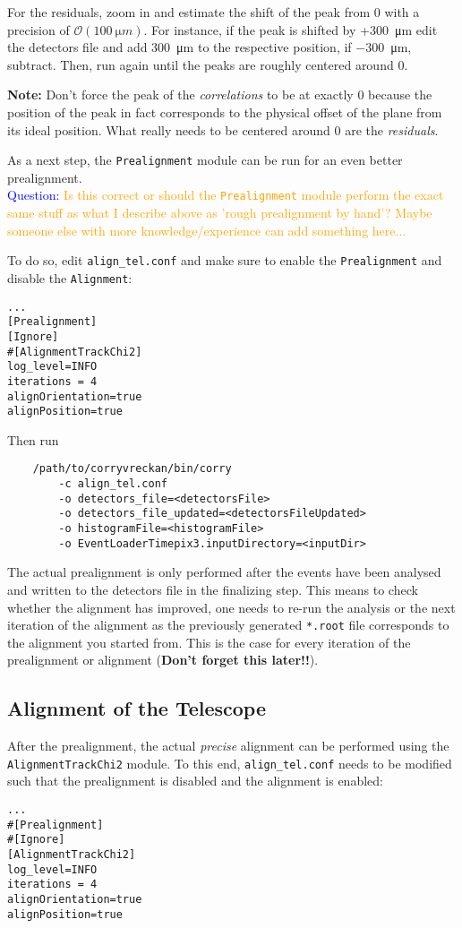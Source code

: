 For the residuals, zoom in and estimate the shift of the peak from 0 with a precision of $\mathcal{O}(\SI{100}{\micro m})$. 
For instance, if the peak is shifted by +\SI{+300}{\micro m} edit the detectors file and add \SI{+300}{\micro m} to the respective position, if \SI{-300}{\micro m}, subtract.
Then, run again until the peaks are roughly centered around 0.

\textbf{Note:} Don't force the peak of the \textit{correlations} to be at exactly 0 because the position of the peak in fact corresponds to the physical offset of the plane from its ideal position. What really needs to be centered around 0 are the \textit{residuals}.

As a next step, the \texttt{Prealignment} module can be run for an even better prealignment.\\
\textcolor{blue}{Question: }\textcolor{orange}{Is this correct or should the \texttt{Prealignment} module perform the exact same stuff as what I describe above as 'rough prealignment by hand'? Maybe someone else with more knowledge/experience can add something here...}

To do so, edit \texttt{align\_tel.conf} and make sure to enable the \texttt{Prealignment} and disable the \texttt{Alignment}:
\begin{verbatim}
...
[Prealignment]
[Ignore]
#[AlignmentTrackChi2]
log_level=INFO
iterations = 4
alignOrientation=true
alignPosition=true
\end{verbatim}

Then run
\begin{verbatim}
    /path/to/corryvreckan/bin/corry 
    	-c align_tel.conf 
    	-o detectors_file=<detectorsFile> 
    	-o detectors_file_updated=<detectorsFileUpdated> 
    	-o histogramFile=<histogramFile> 
    	-o EventLoaderTimepix3.inputDirectory=<inputDir>
\end{verbatim}

The actual prealignment is only performed after the events have been analysed and written to the detectors file in the finalizing step. 
This means to check whether the alignment has improved, one needs to re-run the analysis or the next iteration of the alignment as the previously generated \texttt{*.root} file corresponds to the alignment you started from.
This is the case for every iteration of the prealignment or alignment (\textbf{Don't forget this later!!}).

\subsection*{Alignment of the Telescope}
After the prealignment, the actual \textit{precise} alignment can be performed using the \texttt{AlignmentTrackChi2} module.
To this end, \texttt{align\_tel.conf} needs to be modified such that the prealignment is disabled and the alignment is enabled:
\begin{verbatim}
...
#[Prealignment]
#[Ignore]
[AlignmentTrackChi2]
log_level=INFO
iterations = 4
alignOrientation=true
alignPosition=true
\end{verbatim}

